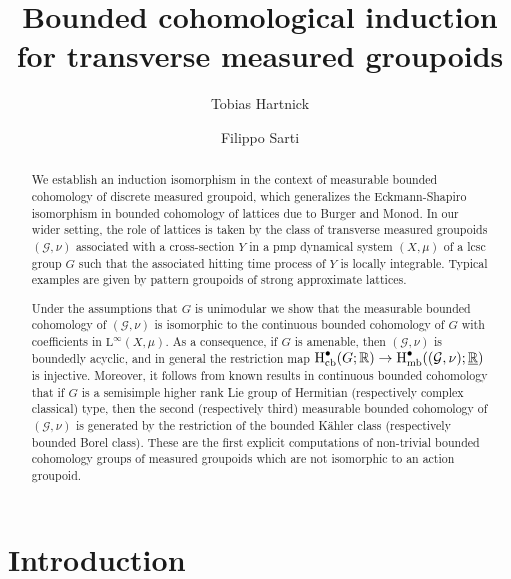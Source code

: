 \documentclass[11pt, oneside]{amsart}
\theoremstyle{definition}
\theoremstyle{remark}
\theoremstyle{TheoremNum}
\newcommand{\Hmb}{\textup{H}_{\textup{mb}}}
\newcommand{\Hcb}{\textup{H}_{\textup{cb}}}
\newcommand{\Linf}{\mathrm{L}^{\infty}}
\newcommand{\cG}{\mathcal{G}}
\newcommand{\bR}{\mathbb{R}}
\begin{document}
\title[Bounded cohomological induction for transverse groupoids]{Bounded cohomological induction for transverse measured groupoids}

\author[T. Hartnick]{Tobias Hartnick}
\address{Institut f\"ur Algebra und Geometrie, KIT, Germany}
\author[F. Sarti]{Filippo Sarti}
\address{Dipartimento di Matematica, Universit\'a di Pisa, Italy}




 
\begin{abstract} 
We establish an induction isomorphism in the context of measurable bounded cohomology of discrete measured groupoid, which generalizes the Eckmann-Shapiro isomorphism in bounded cohomology of lattices due to Burger and Monod. 
In our wider setting, the role of lattices is taken by the class of transverse measured groupoids $(\cG, \nu)$ associated with a cross-section $Y$ in a pmp dynamical system $(X, \mu)$ of a lcsc group $G$ such that the associated hitting time process of $Y$ is locally integrable. Typical examples are given by pattern groupoids of strong approximate lattices. 

Under the assumptions that $G$ is unimodular we show that the measurable bounded cohomology of $(\cG, \nu)$ is isomorphic to the continuous bounded cohomology of $G$ with coefficients in $\Linf(X, \mu)$. As a consequence, if $G$ is amenable, then $(\cG, \nu)$ is boundedly acyclic, and in general the restriction map $\Hcb^\bullet (G; \bR) \to \Hmb^\bullet ((\cG, \nu);\underline{\bR})$ is injective. Moreover, it follows from known results in continuous bounded cohomology that if $G$ is a semisimple higher rank Lie group of Hermitian (respectively complex classical) type, then the second (respectively third) measurable bounded cohomology of $(\cG, \nu)$ is generated by the restriction of the bounded K\"ahler class (respectively bounded Borel class). These are the first explicit computations of non-trivial bounded cohomology groups of measured groupoids which are not isomorphic to an action groupoid.
\end{abstract}

\maketitle

\section{Introduction}
\end{document}
